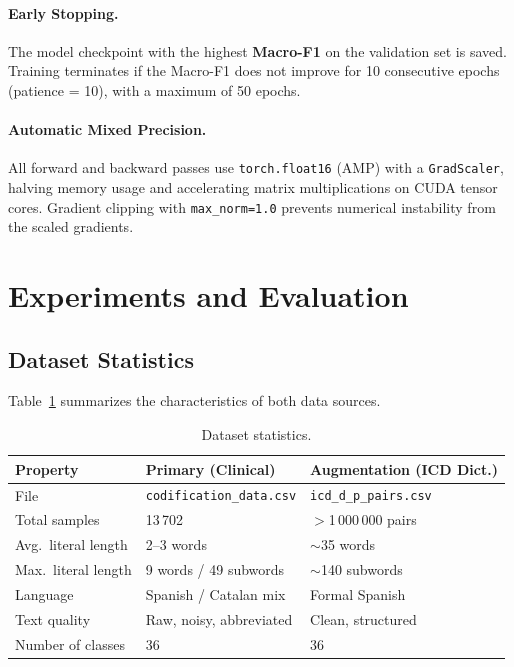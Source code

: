 \documentclass[10pt,a4paper,twocolumn]{article}
\begin{document}
\paragraph{Early Stopping.}
The model checkpoint with the highest \textbf{Macro-F1} on the validation set is
saved. Training terminates if the Macro-F1 does not improve for 10 consecutive
epochs (patience = 10), with a maximum of 50 epochs.

\paragraph{Automatic Mixed Precision.}
All forward and backward passes use \texttt{torch.float16} (AMP) with a
\texttt{GradScaler}, halving memory usage and accelerating matrix multiplications
on CUDA tensor cores. Gradient clipping with \texttt{max\_norm=1.0} prevents
numerical instability from the scaled gradients.

\section{Experiments and Evaluation}
\label{sec:experiments}

\subsection{Dataset Statistics}

Table~\ref{tab:dataset} summarizes the characteristics of both data sources.

\begin{table}[t]
\centering
\caption{Dataset statistics.}
\label{tab:dataset}
\begin{tabular}{lll}
\toprule
\textbf{Property} & \textbf{Primary (Clinical)} & \textbf{Augmentation (ICD Dict.)} \\
\midrule
File                     & \texttt{codification\_data.csv} & \texttt{icd\_d\_p\_pairs.csv} \\
Total samples            & 13\,702                         & $>$1\,000\,000 pairs \\
Avg.\ literal length     & 2--3 words                      & $\sim$35 words \\
Max.\ literal length     & 9 words / 49 subwords           & $\sim$140 subwords \\
Language                 & Spanish / Catalan mix           & Formal Spanish \\
Text quality             & Raw, noisy, abbreviated         & Clean, structured \\
Number of classes        & 36                              & 36 \\
\bottomrule
\end{tabular}
\end{table}
\end{document}
